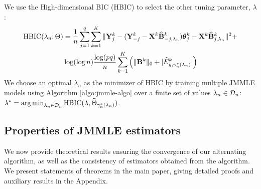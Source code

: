 We use the High-dimensional BIC (HBIC) to select the other tuning parameter, $\lambda$:
%
\begin{align*}
\text{HBIC} (\lambda_n; \Theta) &=
\frac{1}{n} \sum_{j=1}^q \sum_{k=1}^K \| {\mathbf{Y}}^k_j - ({\mathbf{Y}}_{-j}^k - {\mathbf{X}}^k \widehat {{\mathbf{B}}}_{-j,\lambda_n}^k ) {\boldsymbol{\theta}}_j^{k } - {\mathbf{X}}^k \widehat {{\mathbf{B}}}_{j,\lambda_n}^k \|^2 +\\
& \log (\log n) \frac{\log (pq)}{n} \sum_{k=1}^K
\left( \| {\mathbf{B}}^k \|_0 + | \widehat E_{y, \gamma_n^* (\lambda_n)}^k| \right)
\end{align*}
%
We choose an optimal $\lambda_n$ as the minimizer of HBIC by training multiple JMMLE models using Algorithm \ref{algo:jmmle-algo} over a finite set of values $\lambda_n \in {\cal{D}}_n$: 
$
\lambda^* = \operatorname*{arg\,min}_{\lambda_n \in {\cal{D}}_n} \text{HBIC} (\lambda, \widehat \Theta_{\gamma_n^*(\lambda_n)})
$.

%
%
%

%

\subsection{Properties of JMMLE estimators}
\label{sec:jmmle-theory}
We now provide theoretical results ensuring the convergence of our alternating algorithm, as well as the consistency of estimators obtained from the algorithm. We present statements of theorems in the main paper, giving detailed proofs and auxiliary results in the Appendix.

